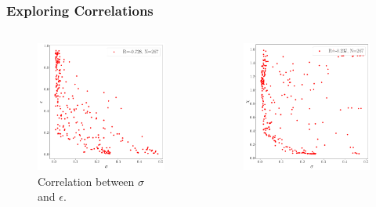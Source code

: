 \documentclass{beamer}
\begin{document}
\begin{frame}
\frametitle{Exploring Correlations}
\begin{columns}
\begin{column}{0.5\textwidth}
\begin{figure}
\centering 
\includegraphics[width=\textwidth]{im/sigma_v_eps_}
\caption{Correlation between $\sigma$ and $\epsilon$.}
\end{figure}
\end{column}
\begin{column}{0.5\textwidth}
\begin{figure}
\centering 
\includegraphics[width=\textwidth]{im/sigma_v_chi_}

\end{figure}
\end{column}
\end{columns}
\end{frame}
\end{document}

